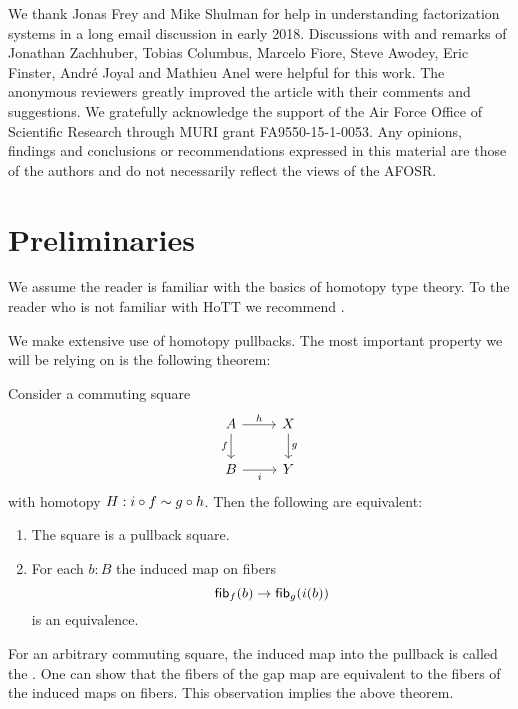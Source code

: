 \documentclass[9pt,twosided]{amsart}
\begin{document}
We thank Jonas Frey and Mike Shulman for help in understanding factorization systems in a long email discussion in early 2018.
Discussions with and remarks of Jonathan Zachhuber, Tobias Columbus, Marcelo Fiore, Steve Awodey, Eric Finster, André Joyal and Mathieu Anel were helpful for this work.
The anonymous reviewers greatly improved the article with their comments and suggestions. 
We gratefully acknowledge the support of the Air Force Office of Scientific Research through MURI grant FA9550-15-1-0053.
Any opinions, findings and conclusions or recommendations expressed in this material are those of the authors and do not necessarily reflect the views of the AFOSR.


\section{Preliminaries}
We assume the reader is familiar with the basics of homotopy type theory. To the reader who is not familiar with HoTT we recommend \cite{UFP}.

We make extensive use of homotopy pullbacks. The most important property we will be relying on is the following theorem:

\begin{thm}
  Consider a commuting square
  \begin{equation*}
    \begin{tikzcd}
      A \arrow[r,"h"] \arrow[d,swap,"f"] & X \arrow[d,"g"] \\
      B \arrow[r,swap,"i"] & Y
    \end{tikzcd}
  \end{equation*}
  with homotopy $H:i\circ f\sim g\circ h$. Then the following are equivalent:
  \begin{enumerate}
  \item The square is a pullback square.
  \item For each $b:B$ the induced map on fibers
    \begin{equation*}
      \fib{f}{b} \to \fib{g}{i(b)}
    \end{equation*}
    is an equivalence.
  \end{enumerate}
\end{thm}

For an arbitrary commuting square, the induced map into the pullback is called the . One can show that the fibers of the gap map are equivalent to the fibers of the induced maps on fibers. This observation implies the above theorem.
\end{document}
